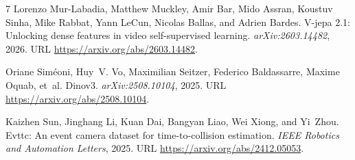\documentclass[twocolumn,letterpaper]{article}
\begin{document}
\begin{thebibliography}{7}
Lorenzo Mur-Labadia, Matthew Muckley, Amir Bar, Mido Assran, Koustuv Sinha,
  Mike Rabbat, Yann LeCun, Nicolas Ballas, and Adrien Bardes.
\newblock V-jepa 2.1: Unlocking dense features in video self-supervised
  learning.
\newblock \emph{arXiv:2603.14482}, 2026.
\newblock URL \url{https://arxiv.org/abs/2603.14482}.

Oriane Sim{\'e}oni, Huy~V. Vo, Maximilian Seitzer, Federico Baldassarre, Maxime
  Oquab, et~al.
\newblock Dinov3.
\newblock \emph{arXiv:2508.10104}, 2025.
\newblock URL \url{https://arxiv.org/abs/2508.10104}.

Kaizhen Sun, Jinghang Li, Kuan Dai, Bangyan Liao, Wei Xiong, and Yi~Zhou.
\newblock Evttc: An event camera dataset for time-to-collision estimation.
\newblock \emph{IEEE Robotics and Automation Letters}, 2025.
\newblock URL \url{https://arxiv.org/abs/2412.05053}.

\end{thebibliography}
\end{document}
